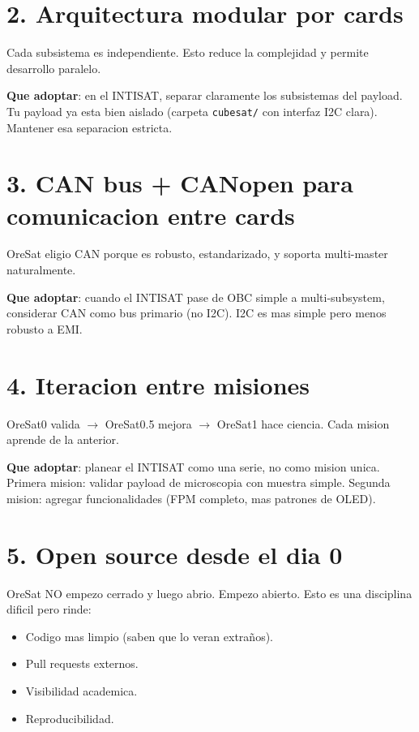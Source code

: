 \documentclass[11pt,a4paper,oneside]{report}
\begin{document}
\section{2. Arquitectura modular por cards}

Cada subsistema es independiente. Esto reduce la complejidad y permite
desarrollo paralelo.

\textbf{Que adoptar}: en el INTISAT, separar claramente los subsistemas
del payload. Tu payload ya esta bien aislado (carpeta \texttt{cubesat/}
con interfaz I2C clara). Mantener esa separacion estricta.

\section{3. CAN bus + CANopen para comunicacion entre cards}

OreSat eligio CAN porque es robusto, estandarizado, y soporta multi-master
naturalmente.

\textbf{Que adoptar}: cuando el INTISAT pase de OBC simple a multi-subsystem,
considerar CAN como bus primario (no I2C). I2C es mas simple pero menos
robusto a EMI.

\section{4. Iteracion entre misiones}

OreSat0 valida $\to$ OreSat0.5 mejora $\to$ OreSat1 hace ciencia. Cada
mision aprende de la anterior.

\textbf{Que adoptar}: planear el INTISAT como una serie, no como mision
unica. Primera mision: validar payload de microscopia con muestra simple.
Segunda mision: agregar funcionalidades (FPM completo, mas patrones de
OLED).

\section{5. Open source desde el dia 0}

OreSat NO empezo cerrado y luego abrio. Empezo abierto. Esto es una
disciplina dificil pero rinde:

\begin{itemize}[leftmargin=2em]
  \item Codigo mas limpio (saben que lo veran extraños).
  \item Pull requests externos.
  \item Visibilidad academica.
  \item Reproducibilidad.
\end{itemize}
\end{document}
